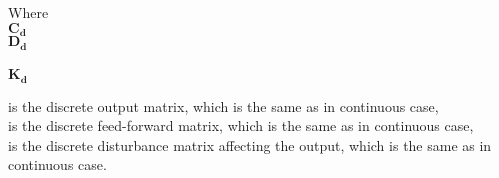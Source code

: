 \begin{minipage}[t]{0.20\textwidth}
Where\\
\hspace*{8mm} $\bm{C_d}$ \\
\hspace*{8mm} $\bm{D_d}$ \\\\
\hspace*{8mm} $\bm{K_d}$ 
\end{minipage}
\begin{minipage}[t]{0.78\textwidth}
\vspace*{2mm}
is the discrete output matrix, which is the same as in continuous case, \\
is the discrete feed-forward matrix, which is the same as in continuous case, \\
is the discrete disturbance matrix affecting the output, which is the same as in continuous case. \\
\end{minipage}




